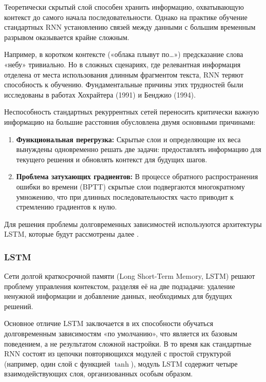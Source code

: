 \documentclass[coursework]{SCWorks}
\begin{document}
    Теоретически скрытый слой способен хранить информацию, охватывающую контекст до самого начала
    последовательности.
    Однако на практике обучение стандартных RNN установлению связей между данными с большим временным
    разрывом оказывается крайне сложным.

    Например, в коротком контексте («облака плывут по\ldots») предсказание слова «небу» тривиально.
    Но в сложных сценариях, где релевантная информация отделена от места использования длинным
    фрагментом текста, RNN теряют способность к обучению.
    Фундаментальные причины этих трудностей были исследованы в работах Хохрайтера (1991) и Бенджио (1994).

    Неспособность стандартных рекуррентных сетей переносить критически важную информацию на большие расстояния
    обусловлена двумя основными причинами:

    \begin{enumerate}
        \item \textbf{Функциональная перегрузка:} Скрытые слои и определяющие их веса вынуждены одновременно решать две задачи: предоставлять информацию для текущего решения и обновлять контекст для будущих шагов.
        \item \textbf{Проблема затухающих градиентов:} В процессе обратного распространения ошибки во времени (BPTT) скрытые слои подвергаются многократному умножению, что при длинных последовательностях часто приводит к стремлению градиентов к нулю.
    \end{enumerate}

    Для решения проблемы долговременных зависимостей используются архитектуры LSTM,
    которые будут рассмотрены далее \cite{olah2015lstm}.

    \subsubsection{LSTM}

    Сети долгой краткосрочной памяти (Long Short-Term Memory, LSTM)
    решают проблему управления контекстом, разделяя её на две подзадачи:
    удаление ненужной информации и добавление данных, необходимых для будущих решений.

    Основное отличие LSTM заключается в их способности обучаться долговременным зависимостям «по умолчанию»,
    что является их базовым поведением, а не результатом сложной настройки.
    В то время как стандартные RNN состоят из цепочки повторяющихся модулей с простой структурой
    (например, один слой с функцией $\tanh$), модуль LSTM содержит четыре взаимодействующих слоя,
    организованных особым образом.
\end{document}
